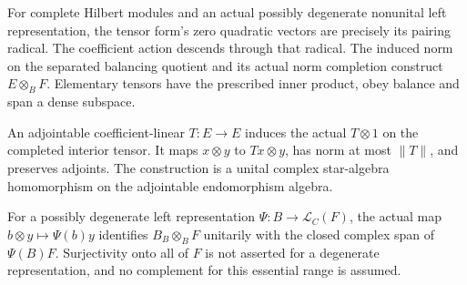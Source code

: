 \begin{proposition}\label{prop:completed-interior-module-tensor}
\leanok
For complete Hilbert modules and an actual possibly degenerate nonunital
left representation, the tensor form's zero quadratic vectors are precisely
its pairing radical. The coefficient action descends through that radical.
The induced norm on the separated balancing quotient and its actual norm
completion construct $E\otimes_B F$. Elementary tensors have the prescribed
inner product, obey balance and span a dense subspace.
\end{proposition}

\begin{proposition}\label{prop:interior-tensor-operators}
\leanok
An adjointable coefficient-linear $T:E\to E$ induces the actual
$T\otimes1$ on the completed interior tensor. It maps
$x\otimes y$ to $Tx\otimes y$, has norm at most $\|T\|$, and
preserves adjoints. The construction is a unital complex star-algebra
homomorphism on the adjointable endomorphism algebra.
\end{proposition}

\begin{proposition}\label{prop:standard-tensor-essential-range}
\leanok
For a possibly degenerate left representation $\Psi:B\to\mathcal L_C(F)$,
the actual map $b\otimes y\mapsto\Psi(b)y$ identifies $B_B\otimes_B F$
unitarily with the closed complex span of $\Psi(B)F$. Surjectivity onto
all of $F$ is not asserted for a degenerate representation, and no
complement for this essential range is assumed.
\end{proposition}

